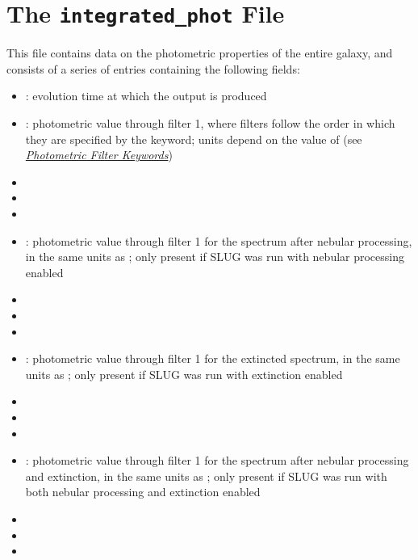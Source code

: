 \documentclass[letterpaper,10pt,english]{sphinxmanual}
\begin{document}
\section{The \texttt{integrated\_phot} File}
\label{output:the-integrated-phot-file}\label{output:ssec-int-phot-file}
This file contains data on the photometric properties of the entire galaxy, and consists of a series of entries containing the following fields:
\begin{itemize}
\item {} 
: evolution time at which the output is produced

\item {} 
: photometric value through filter 1, where filters follow the order in which they are specified by the  keyword; units depend on the value of  (see {\hyperref[parameters:ssec\string-phot\string-keywords]{\emph{Photometric Filter Keywords}}})

\item {} 

\item {} 

\item {} 

\item {} 
: photometric value through filter 1 for the spectrum after nebular processing, in the same units as ; only present if SLUG was run with nebular processing enabled

\item {} 

\item {} 

\item {} 

\item {} 
: photometric value through filter 1 for the extincted spectrum, in the same units as ; only present if SLUG was run with extinction enabled

\item {} 

\item {} 

\item {} 

\item {} 
: photometric value through filter 1 for the spectrum after nebular processing and extinction, in the same units as ; only present if SLUG was run with both nebular processing and extinction enabled

\item {} 

\item {} 

\item {} 

\end{itemize}
\end{document}
